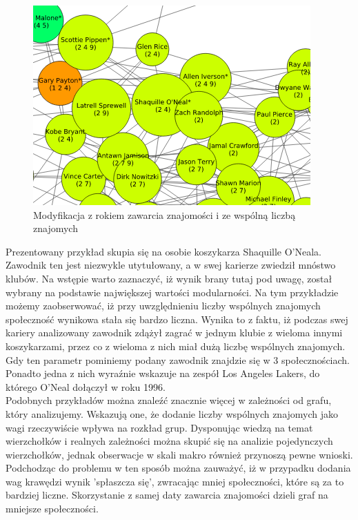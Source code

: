\documentclass{article}
\begin{document}
\begin{figure}[H]
\centering
\includegraphics[width=\textwidth]{images/is-sample-7.png}
\caption{Modyfikacja z rokiem zawarcia znajomości i ze wspólną liczbą znajomych}
\end{figure}

Prezentowany przykład skupia się na osobie koszykarza Shaquille O'Neala. Zawodnik ten jest niezwykle utytułowany, a w swej karierze zwiedził mnóstwo klubów. Na wstępie warto zaznaczyć, iż wynik brany tutaj pod uwagę, został wybrany na podstawie największej wartości modularności. Na tym przykładzie możemy zaobserwować, iż przy uwzględnieniu liczby wspólnych znajomych społeczność wynikowa stała się bardzo liczna. Wynika to z faktu, iż podczas swej kariery analizowany zawodnik zdążył zagrać w jednym klubie z wieloma innymi koszykarzami, przez co z wieloma z nich miał dużą liczbę wspólnych znajomych. Gdy ten parametr pominiemy podany zawodnik znajdzie się w 3 społecznościach. Ponadto jedna z nich wyraźnie wskazuje na zespół Los Angeles Lakers, do którego O'Neal dołączył w roku 1996. \\

Podobnych przykładów można znaleźć znacznie więcej w zależności od grafu, który analizujemy. Wskazują one, że dodanie liczby wspólnych znajomych jako wagi rzeczywiście wpływa na rozkład grup. Dysponując wiedzą na temat wierzchołków i realnych zależności można skupić się na analizie pojedynczych wierzchołków, jednak obserwacje w skali makro również przynoszą pewne wnioski. Podchodząc do problemu w ten sposób można zauważyć, iż w przypadku dodania wag krawędzi wynik 'spłaszcza się', zwracając mniej społeczności, które są za to bardziej liczne. Skorzystanie z samej daty zawarcia znajomości dzieli graf na mniejsze społeczności. \\
\end{document}
